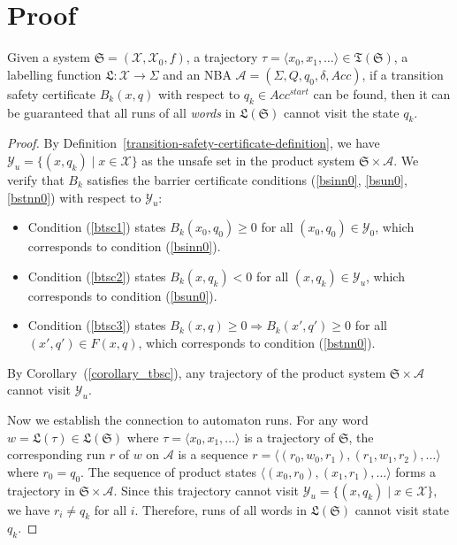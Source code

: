 \section{Proof}

\begin{theorem}
  \label{transition-safety-lemma}
  Given a system $\mathfrak{S} = (\mathcal{X}, \mathcal{X}_0, f)$, a trajectory $\tau=\langle x_0, x_1, \dots \rangle \in \mathfrak{T}(\mathfrak{S})$, a labelling function $\mathfrak{L}:\mathcal{X} \rightarrow \Sigma$ and an NBA $\mathcal{A}=(\Sigma, Q, q_0, \delta, Acc)$, if a transition safety certificate $B_{k}(x, q)$ with respect to $q_k \in Acc^{start}$ can be found, then it can be guaranteed that all runs of all \emph{words} in $\mathfrak{L}(\mathfrak{S})$ cannot visit the state $q_k$.
\end{theorem}

\begin{proof}
  By Definition~\ref{transition-safety-certificate-definition}, we have $\mathcal{Y}_u = \{(x, q_k) \mid x \in \mathcal{X}\}$ as the unsafe set in the product system $\mathfrak{S} \times \mathcal{A}$. We verify that $B_k$ satisfies the barrier certificate conditions (\ref{bsinn0}, \ref{bsun0}, \ref{bstnn0}) with respect to $\mathcal{Y}_u$:
  \begin{itemize}
    \item Condition (\ref{btsc1}) states $B_k(x_0, q_0) \geq 0$ for all $(x_0, q_0) \in \mathcal{Y}_0$, which corresponds to condition (\ref{bsinn0}).
    \item Condition (\ref{btsc2}) states $B_k(x, q_k) < 0$ for all $(x, q_k) \in \mathcal{Y}_u$, which corresponds to condition (\ref{bsun0}).
    \item Condition (\ref{btsc3}) states $B_k(x, q) \geq 0 \Rightarrow B_k(x', q') \geq 0$ for all $(x', q') \in F(x, q)$, which corresponds to condition (\ref{bstnn0}).
  \end{itemize}

  By Corollary~(\ref{corollary_tbsc}), any trajectory of the product system $\mathfrak{S} \times \mathcal{A}$ cannot visit $\mathcal{Y}_u$.

  Now we establish the connection to automaton runs. For any word $w = \mathfrak{L}(\tau) \in \mathfrak{L}(\mathfrak{S})$ where $\tau = \langle x_0, x_1, \dots \rangle$ is a trajectory of $\mathfrak{S}$, the corresponding run $r$ of $w$ on $\mathcal{A}$ is a sequence $r = \langle (r_0, w_0, r_1), (r_1, w_1, r_2), \ldots \rangle$ where $r_0 = q_0$. The sequence of product states $\langle (x_0, r_0), (x_1, r_1), \ldots \rangle$ forms a trajectory in $\mathfrak{S} \times \mathcal{A}$. Since this trajectory cannot visit $\mathcal{Y}_u = \{(x, q_k) \mid x \in \mathcal{X}\}$, we have $r_i \neq q_k$ for all $i$. Therefore, runs of all words in $\mathfrak{L}(\mathfrak{S})$ cannot visit state $q_k$.
\end{proof}

